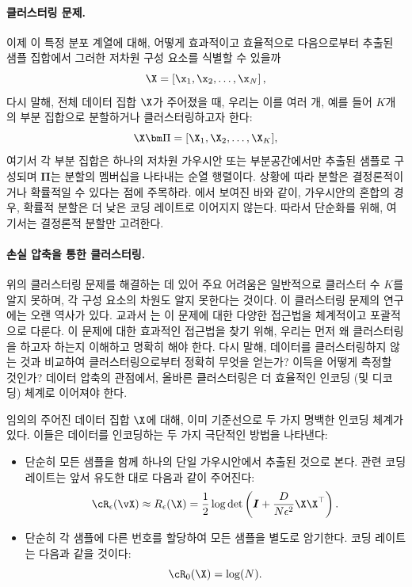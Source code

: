 \documentclass[../../book-main_ko.tex]{subfiles}
\begin{document}
\paragraph{클러스터링 문제.}
이제 이 특정 분포 계열에 대해, 어떻게 효과적이고 효율적으로 다음으로부터 추출된 샘플 집합에서 그러한 저차원 구성 요소를 식별할 수 있을까
\begin{equation}
	\X = \left[\x_1, \x_2, \ldots, \x_N\right],
\end{equation}
다시 말해, 전체 데이터 집합 $\X$가 주어졌을 때, 우리는 이를 여러 개, 예를 들어 $K$개의 부분 집합으로 분할하거나 클러스터링하고자 한다:
\begin{equation}
	\X\bm \Pi = [\X_1, \X_2, \dots, \X_K],
\end{equation}
여기서 각 부분 집합은 하나의 저차원 가우시안 또는 부분공간에서만 추출된 샘플로 구성되며 $\bm \Pi$는 분할의 멤버십을 나타내는 순열 행렬이다. 상황에 따라 분할은 결정론적이거나 확률적일 수 있다는 점에 주목하라. \cite{ma2007segmentation}에서 보여진 바와 같이, 가우시안의 혼합의 경우, 확률적 분할은 더 낮은 코딩 레이트로 이어지지 않는다. 따라서 단순화를 위해, 여기서는 결정론적 분할만 고려한다.

\paragraph{손실 압축을 통한 클러스터링.}
위의 클러스터링 문제를 해결하는 데 있어 주요 어려움은 일반적으로 클러스터 수 $K$를 알지 못하며, 각 구성 요소의 차원도 알지 못한다는 것이다. 이 클러스터링 문제의 연구에는 오랜 역사가 있다. 교과서 \cite{GPCA}는 이 문제에 대한 다양한 접근법을 체계적이고 포괄적으로 다룬다. 이 문제에 대한 효과적인 접근법을 찾기 위해, 우리는 먼저 왜 클러스터링을 하고자 하는지 이해하고 명확히 해야 한다. 다시 말해, 데이터를 클러스터링하지 않는 것과 비교하여 클러스터링으로부터 정확히 무엇을 얻는가? 이득을 어떻게 측정할 것인가? 데이터 압축의 관점에서, 올바른 클러스터링은 더 효율적인 인코딩 (및 디코딩) 체계로 이어져야 한다.

임의의 주어진 데이터 집합 $\X$에 대해, 이미 기준선으로 두 가지 명백한 인코딩 체계가 있다. 이들은 데이터를 인코딩하는 두 가지 극단적인 방법을 나타낸다:
\begin{itemize}
	\item 단순히 모든 샘플을 함께 하나의 단일 가우시안에서 추출된 것으로 본다. 관련 코딩 레이트는 앞서 유도한 대로 다음과 같이 주어진다:
	      \begin{equation}
		      \cR_{\epsilon}(\vX) \approx R_{\epsilon}(\X) = \frac{1}{2} \log \det \left(\boldsymbol{I} + \frac{D}{N\epsilon^2} \X\X^\top \right).
	      \end{equation}
	\item 단순히 각 샘플에 다른 번호를 할당하여 모든 샘플을 별도로 암기한다. 코딩 레이트는 다음과 같을 것이다:
	      \begin{equation}
		      \cR_0(\X) = \log(N).
	      \end{equation}
\end{itemize}
\end{document}
